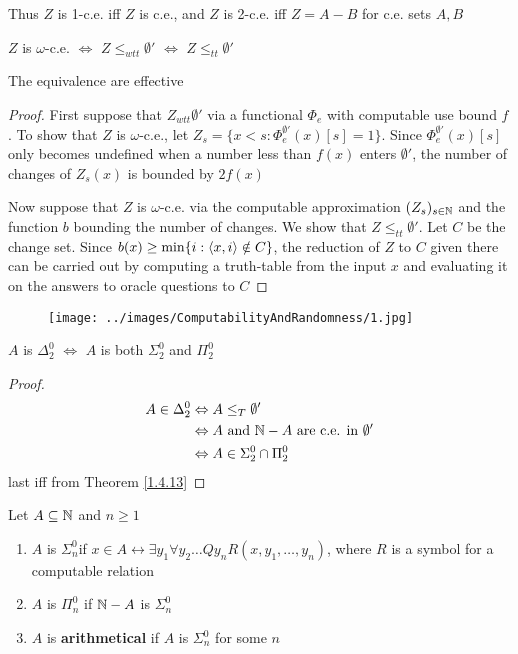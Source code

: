 \documentclass[11pt]{article}
\begin{document}
Thus \(Z\) is 1-c.e. iff \(Z\) is c.e., and \(Z\)  is 2-c.e. iff \(Z=A-B\) for c.e. sets \(A,B\)

\begin{proposition}[]
\(Z\) is \(\omega\)-c.e. \(\Leftrightarrow\) \(Z\le_{wtt}\emptyset'\) \(\Leftrightarrow\) \(Z\le_{tt}\emptyset'\)

The equivalence are effective
\end{proposition}

\begin{proof}
First suppose that \(Z_{wtt}\emptyset'\) via a functional \(\Phi_e\) with computable use bound \(f\). To
show that \(Z\) is \(\omega\)-c.e., let \(Z_s=\{x<s:\Phi_e^{\emptyset'}(x)[s]=1\}\). Since \(\Phi_e^{\emptyset'}(x)[s]\) only
becomes undefined when a number less than \(f(x)\) enters \(\emptyset'\), the number of changes
of \(Z_s(x)\) is bounded by \(2f(x)\)

Now suppose that \(Z\) is \(\omega\)-c.e. via the computable approximation \((Z_s)_{s\in\mathbb{N}}\) and the
function \(b\) bounding the number of changes. We show that \(Z\le_{tt}\emptyset'\). Let \(C\) be the
change set. Since \(b(x)\ge\min\{i:\langle x,i\rangle\notin C\}\), the reduction of \(Z\) to \(C\) given there can be
carried out by computing a truth-table from the input \(x\) and evaluating it on the answers to
oracle questions to \(C\)
\end{proof}

\begin{figure}[htbp]
\centering
\texttt{[image: ../images/ComputabilityAndRandomness/1.jpg]}
\label{}
\end{figure}


\begin{corollary}[]
\(A\) is \(\Delta_2^0\) \(\Leftrightarrow\) \(A\) is both \(\Sigma_2^0\) and \(\Pi_2^0\)
\end{corollary}

\begin{proof}
\begin{align*}
A\in\Delta_2^0&\Leftrightarrow A\le_T\emptyset'\\
&\Leftrightarrow A\text{ and }\mathbb{N}-A\text{ are c.e. in }\emptyset'\\
&\Leftrightarrow A\in\Sigma_2^0\cap\Pi_2^0
\end{align*}
last iff from Theorem \ref{1.4.13}
\end{proof}


\begin{definition}[]
Let \(A\subseteq\mathbb{N}\) and \(n\ge 1\)
\begin{enumerate}
\item \(A\) is \(\Sigma_n^0\)if \(x\in A\leftrightarrow\exists y_1\forall y_2\dots Qy_nR(x,y_1,\dots,y_n)\), where \(R\) is a symbol for a
computable relation
\item \(A\) is \(\Pi_n^0\) if \(\mathbb{N}-A\) is \(\Sigma_n^0\)
\item \(A\) is \textbf{arithmetical} if \(A\) is \(\Sigma_n^0\) for some \(n\)
\end{enumerate}
\end{definition}
\end{document}
